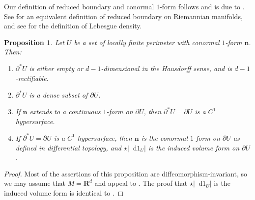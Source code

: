 \documentclass[reqno,10pt]{amsart}
\newcommand{\RR}{\mathbf{R}}
\newcommand*\dif{\mathop{}\!\mathrm{d}}
\newcommand{\normal}{\mathbf n}
\newtheorem{proposition}[theorem]{Proposition}
\theoremstyle{definition}
\numberwithin{equation}{section}
\begin{document}
Our definition of reduced boundary and conormal $1$-form follows \cite[Definition 3.3]{Giusti77} and is due to \cite{deGiorgi55}.
See \cite{Battista_2021} for an equivalent definition of reduced boundary on Riemannian manifolds, and see \cite[Chapter 6]{Pugh02} for the definition of Lebesgue density.

\begin{proposition}\label{locality of Caccioppoli}
    Let $U$ be a set of locally finite perimeter with conormal $1$-form $\normal$.
    Then:
    \begin{enumerate}
    \item $\partial^* U$ is either empty or $d-1$-dimensional in the Hausdorff sense, and is $d-1$-rectifiable.
    \item $\partial^* U$ is a dense subset of $\partial U$.
    \item If $\normal$ extends to a continuous $1$-form on $\partial U$, then $\partial^* U = \partial U$ is a $C^1$ hypersurface.
    \item If $\partial^* U = \partial U$ is a $C^1$ hypersurface, then $\normal$ is the conormal $1$-form on $\partial U$ as defined in differential topology, and $\star |\dif 1_U|$ is the induced volume form on $\partial U$.
\end{enumerate}
\end{proposition}
\begin{proof}
Most of the assertions of this proposition are diffeomorphism-invariant, so we may assume that $M = \RR^d$ and appeal to \cite[Chapters 2-4]{Giusti77}.
The proof that $\star |\dif 1_U|$ is the induced volume form is identical to \cite[Example 1.4]{Giusti77}.
\end{proof}
\end{document}
